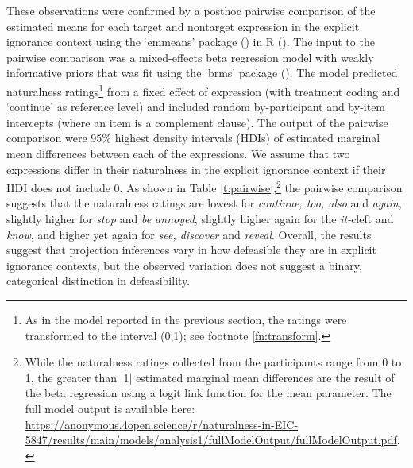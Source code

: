 \documentclass[11pt,fleqn]{article}
\newcommand{\6}{\mbox{$[\hspace*{-.6mm}[$}}
\newcommand{\9}{\mbox{$]\hspace*{-.6mm}]$}}
\begin{document}
These observations were confirmed by a posthoc pairwise comparison of the estimated means for each target and nontarget expression in the explicit ignorance context using the `emmeans' package (\citealt{emmeans}) in R (\citealt{r}). The input to the pairwise comparison was a mixed-effects beta regression model with weakly informative priors that was fit using the `brms' package (\citealt{buerkner2017}). The model predicted naturalness ratings\footnote{As in the model reported in the previous section, the ratings were transformed to the interval (0,1); see footnote \ref{fn:transform}.} from a fixed effect of expression (with treatment coding and `continue' as reference level) and included random by-participant and by-item intercepts (where an item is a complement clause). The output of the pairwise comparison were 95\% highest density intervals (HDIs) of estimated marginal mean differences between each of the expressions. We assume that two expressions differ in their naturalness in the explicit ignorance context if their HDI does not include 0. As shown in Table \ref{t:pairwise},\footnote{While the naturalness ratings collected from the participants range from 0 to 1, the greater than $|$1$|$  estimated marginal mean differences are the result of the beta regression using a logit link function for the mean parameter. The full model output is available here: \url{https://anonymous.4open.science/r/naturalness-in-EIC-5847/results/main/models/analysis1/fullModelOutput/fullModelOutput.pdf}.} the pairwise comparison suggests that the naturalness ratings are lowest for \emph{continue, too, also} and \emph{again}, slightly higher for \emph{stop} and \emph{be annoyed}, slightly higher again for the {\em it-}cleft and \emph{know}, and higher yet again for \emph{see, discover} and \emph{reveal}. Overall, the results suggest that projection inferences vary in how defeasible they are in explicit ignorance contexts, but the observed variation does not suggest a binary, categorical distinction in defeasibility.
\end{document}
